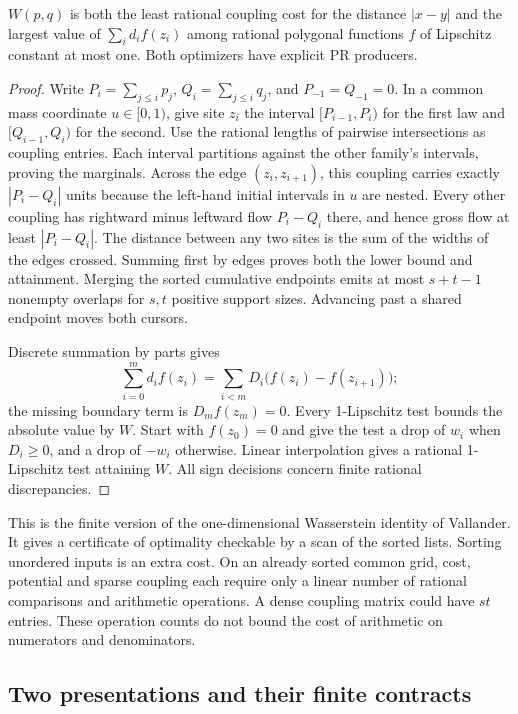 \begin{lemma}\label{lem:dual}
$W(p,q)$ is both the least rational coupling cost for the distance $|x-y|$ and
the largest value of $\sum_i d_i f(z_i)$ among rational polygonal functions $f$
of Lipschitz constant at most one. Both optimizers have explicit PR producers.
\end{lemma}
\begin{proof}
Write $P_i=\sum_{j\le i}p_j$, $Q_i=\sum_{j\le i}q_j$, and $P_{-1}=Q_{-1}=0$.
In a common mass coordinate $u\in[0,1)$, give site $z_i$ the interval
$[P_{i-1},P_i)$ for the first law and $[Q_{i-1},Q_i)$ for the second.
Use the rational lengths of pairwise intersections as coupling entries.
Each interval partitions against the other family's intervals, proving the
marginals. Across the edge $(z_i,z_{i+1})$, this coupling carries exactly
$|P_i-Q_i|$ units because the left-hand initial intervals in $u$ are nested.
Every other coupling has rightward minus leftward flow $P_i-Q_i$ there,
and hence gross flow at least $|P_i-Q_i|$. The distance between any two
sites is the sum of the widths of the edges crossed. Summing first by edges
proves both the lower bound and attainment. Merging the sorted cumulative
endpoints emits at most $s+t-1$ nonempty overlaps for $s,t$ positive support
sizes. Advancing past a shared endpoint moves both cursors.

Discrete summation by parts gives
\[
 \sum_{i=0}^m d_i f(z_i)
 =\sum_{i<m}D_i\big(f(z_i)-f(z_{i+1})\big);
\]
the missing boundary term is $D_m f(z_m)=0$. Every 1-Lipschitz test bounds
the absolute value by $W$. Start with $f(z_0)=0$ and give the test a drop of
$w_i$ when $D_i\ge0$, and a drop of $-w_i$ otherwise. Linear interpolation
gives a rational 1-Lipschitz test attaining $W$. All sign decisions concern
finite rational discrepancies.
\end{proof}

This is the finite version of the one-dimensional Wasserstein identity of
Vallander. It gives a certificate of optimality checkable by a scan of the
sorted lists. Sorting unordered inputs is an extra cost. On an already sorted
common grid, cost, potential and sparse coupling each require only a linear
number of rational comparisons and arithmetic operations. A dense coupling
matrix could have $st$ entries. These operation counts do not bound the cost
of arithmetic on numerators and denominators.

\subsection{Two presentations and their finite contracts}

